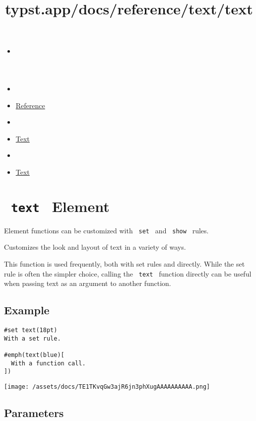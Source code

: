 \title{typst.app/docs/reference/text/text}

\begin{itemize}
\tightlist
\item
  \href{/docs}{}
\item
  
\item
  \href{/docs/reference/}{Reference}
\item
  
\item
  \href{/docs/reference/text/}{Text}
\item
  
\item
  \href{/docs/reference/text/text/}{Text}
\end{itemize}

\section{\texorpdfstring{\texttt{\ text\ } {{ Element
}}}{ text   Element }}\label{summary}

\label{element-tooltip}
Element functions can be customized with \texttt{\ set\ } and
\texttt{\ show\ } rules.

Customizes the look and layout of text in a variety of ways.

This function is used frequently, both with set rules and directly.
While the set rule is often the simpler choice, calling the
\texttt{\ text\ } function directly can be useful when passing text as
an argument to another function.

\subsection{Example}\label{example}

\begin{verbatim}
#set text(18pt)
With a set rule.

#emph(text(blue)[
  With a function call.
])
\end{verbatim}

\texttt{[image: /assets/docs/TE1TKvqGw3ajR6jn3phXugAAAAAAAAAA.png]}

\subsection{\texorpdfstring{{ Parameters
}}{ Parameters }}\label{parameters}

